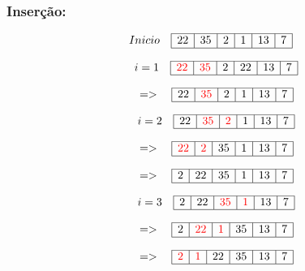 \documentclass{article}
\begin{document}
\subsubsection{Inserção:}

\[
Inicio \quad
\begin{array}{|c|c|c|c|c|c|}
\hline
22 & 35 & 2 & 1 & 13 & 7 \\ 
\hline
\end{array}
\]

\[
    \quad i=1 \quad
\begin{array}{|c|c|c|c|c|c|}
\hline
\textcolor{red}{22} & \textcolor{red}{35} & 2 & 22 & 13 & 7 \\ 
\hline
\end{array}
\]

\[
    \quad => \quad
\begin{array}{|c|c|c|c|c|c|}
\hline
 22 & \textcolor{red}{35} & 2 & 1 & 13 & 7 \\  
\hline
\end{array}
\]

\[
    \quad i = 2 \quad
\begin{array}{|c|c|c|c|c|c|}
\hline
22 & \textcolor{red}{35} & \textcolor{red}{2} & 1 & 13 & 7 \\  
\hline
\end{array}
\]

\[
    \quad => \quad
\begin{array}{|c|c|c|c|c|c|}
\hline
\textcolor{red}{22} & \textcolor{red}{2} & 35 & 1 & 13 & 7 \\  
\hline
\end{array}
\]

\[
    \quad => \quad
\begin{array}{|c|c|c|c|c|c|}
\hline
2 & 22 & 35 & 1 & 13 & 7 \\  
\hline
\end{array}
\]

\[
    \quad i = 3 \quad
\begin{array}{|c|c|c|c|c|c|}
\hline
2 & 22 & \textcolor{red}{35} & \textcolor{red}{1} & 13 & 7 \\   
\hline
\end{array}
\]

\[
    \quad => \quad
\begin{array}{|c|c|c|c|c|c|}
\hline
2 & \textcolor{red}{22} & \textcolor{red}{1} & 35 &  13 & 7 \\   
\hline
\end{array}
\]

\[
    \quad => \quad
\begin{array}{|c|c|c|c|c|c|}
\hline
\textcolor{red}{2} & \textcolor{red}{1} & 22 &  35 &  13 & 7 \\   
\hline
\end{array}
\]
\end{document}
